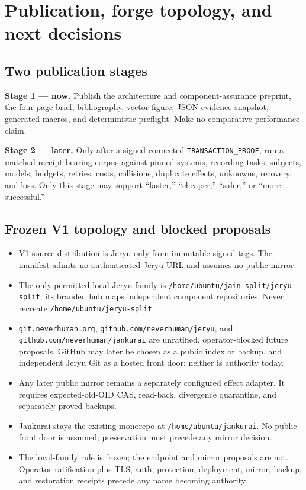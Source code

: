 \documentclass[11pt,letterpaper]{article}
\begin{document}
\section*{Publication, forge topology, and next decisions}

\subsection*{Two publication stages}

\textbf{Stage 1 --- now.} Publish the architecture and component-assurance
preprint, the four-page brief, bibliography, vector figure, JSON evidence
snapshot, generated macros, and deterministic preflight. Make no comparative
performance claim.

\textbf{Stage 2 --- later.} Only after a signed connected
\texttt{TRANSACTION\_PROOF}, run a matched receipt-bearing corpus against pinned
systems, recording tasks, subjects, models, budgets, retries, costs,
collisions, duplicate effects, unknowns, recovery, and loss. Only this stage
may support ``faster,'' ``cheaper,'' ``safer,'' or ``more successful.''

\subsection*{Frozen V1 topology and blocked proposals}

\begin{itemize}
\item V1 source distribution is Jeryu-only from immutable signed tags. The
manifest admits no authenticated Jeryu URL and assumes no public mirror.
\item The only permitted local Jeryu family is
\texttt{/home/ubuntu/jain-split/jeryu-split}; its branded hub maps independent
component repositories. Never recreate \texttt{/home/ubuntu/jeryu-split}.
\item \texttt{git.neverhuman.org}, \texttt{github.com/neverhuman/jeryu}, and
\texttt{github.com/neverhuman/jankurai} are unratified, operator-blocked future
proposals. GitHub may later be chosen as a public index or backup, and
independent Jeryu Git as a hosted front door; neither is authority today.
\item Any later public mirror remains a separately configured effect adapter.
It requires expected-old-OID CAS, read-back, divergence quarantine, and
separately proved backups.
\item Jankurai stays the existing monorepo at \texttt{/home/ubuntu/jankurai}.
No public front door is assumed; preservation must precede any mirror decision.
\item The local-family rule is frozen; the endpoint and mirror proposals are
not. Operator ratification plus TLS, auth, protection, deployment, mirror,
backup, and restoration receipts precede any name becoming authority.
\end{itemize}
\end{document}
